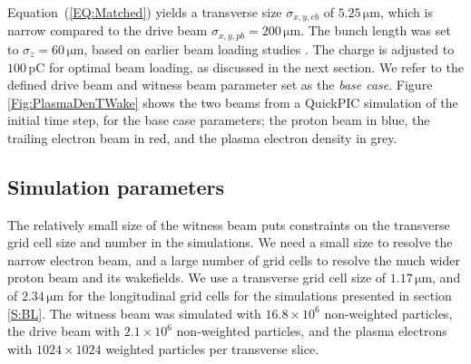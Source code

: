 \documentclass[aps,prstab,reprint,amsmath,amssymb,groupedaddress]{revtex4-1}
\newcommand{\unit}[1]{\,\mathrm{#1}}
\newcommand{\nexp}[1]{\times 10^{#1}}
\begin{document}
Equation~(\ref{EQ:Matched}) yields a transverse size $\sigma_{x,y,eb}$ of $5.25\unit{\mu m}$, which is narrow compared
to the drive beam $\sigma_{x,y,pb} = 200\unit{\mu m}$. The bunch length was set to $\sigma_{z} = 60\unit{\mu m}$, based
on earlier beam loading studies \cite{berglyd_olsen:2016}. The charge is adjusted to $100\unit{pC}$ for optimal beam
loading, as discussed in the next section. We refer to the defined drive beam and witness beam parameter set as the
\emph{base case}. Figure \ref{Fig:PlasmaDenTWake} shows the two beams from a QuickPIC simulation of the initial time
step, for the base case parameters; the proton beam in blue, the trailing electron beam in red, and the plasma electron
density in grey. 



\subsection{Simulation parameters}\label{SIM}

The relatively small size of the witness beam puts constraints on the transverse grid cell size and number in the
simulations. We need a small size to resolve the narrow electron beam, and a large number of grid cells to resolve the
much wider proton beam and its wakefields. We use a transverse grid cell size of $1.17\unit{\mu m}$, and of
$2.34\unit{\mu m}$ for the longitudinal grid cells for the simulations presented in section \ref{S:BL}. The witness beam
was simulated with $16.8\nexp{6}$ non-weighted particles, the drive beam with $2.1\nexp{6}$ non-weighted particles, and
the plasma electrons with $1024 \times 1024$ weighted particles per transverse slice.
\end{document}
